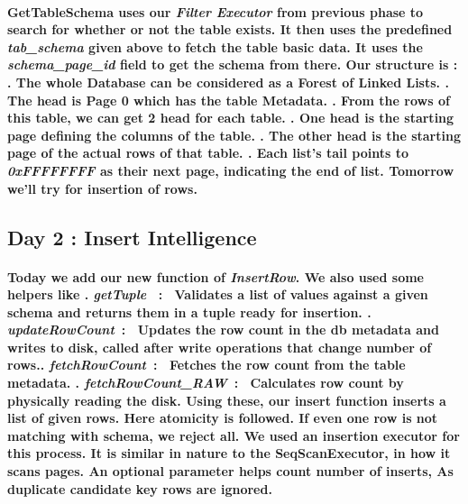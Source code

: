 \documentclass{article}
\begin{document}
\paragraph{
    GetTableSchema uses our \textit{Filter Executor} from previous phase to search for whether or not the table exists.
    It then uses the predefined \textit{tab\_schema} given above to fetch the table basic data. It uses the \textit{schema\_page\_id} field
    to get the schema from there. Our structure is : . The whole Database can be considered as a Forest of Linked Lists. . The head is Page 0 which has the table Metadata. . From the rows of this table, we can get 2 head for each table. . One head is the starting page defining the columns of the table. . The other head is the starting page of the actual rows of that table. . Each list's tail points to \textit{0xFFFFFFFF} as their next page, indicating the end of list. \newline
    Tomorrow we'll try for insertion of rows.
}

\newpage
\subsection{Day 2 : Insert Intelligence}

\paragraph{
    Today we add our new function of \textit{InsertRow}. We also used some helpers like . \textit{getTuple} \ : \ Validates a list of values against a given schema and returns them in a tuple ready for insertion. . \textit{updateRowCount}\ : \ Updates the row count in the db metadata and writes to disk, called after write operations that change number of rows.. \textit{fetchRowCount}\ : \ Fetches the row count from the table metadata. . \textit{fetchRowCount\_RAW}\ : \ Calculates row count by physically reading the disk. \newline
    Using these, our insert function inserts a list of given rows. Here atomicity is followed. If even one row is not matching with schema, we reject all.
    We used an insertion executor for this process. It is similar in nature to the SeqScanExecutor, in how it scans pages. An optional parameter helps count number of inserts, As duplicate candidate key rows are ignored.
} \mbox{} \\
\end{document}
